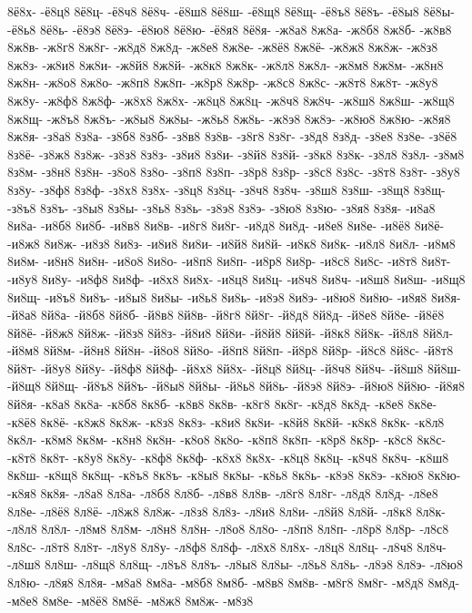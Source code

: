 {8ё8х-
-ё8ц8
8ё8ц-
-ё8ч8
8ё8ч-
-ё8ш8
8ё8ш-
-ё8щ8
8ё8щ-
-ё8ъ8
8ё8ъ-
-ё8ы8
8ё8ы-
-ё8ь8
8ё8ь-
-ё8э8
8ё8э-
-ё8ю8
8ё8ю-
-ё8я8
8ё8я-
-ж8а8
8ж8а-
-ж8б8
8ж8б-
-ж8в8
8ж8в-
-ж8г8
8ж8г-
-ж8д8
8ж8д-
-ж8е8
8ж8е-
-ж8ё8
8ж8ё-
-ж8ж8
8ж8ж-
-ж8з8
8ж8з-
-ж8и8
8ж8и-
-ж8й8
8ж8й-
-ж8к8
8ж8к-
-ж8л8
8ж8л-
-ж8м8
8ж8м-
-ж8н8
8ж8н-
-ж8о8
8ж8о-
-ж8п8
8ж8п-
-ж8р8
8ж8р-
-ж8с8
8ж8с-
-ж8т8
8ж8т-
-ж8у8
8ж8у-
-ж8ф8
8ж8ф-
-ж8х8
8ж8х-
-ж8ц8
8ж8ц-
-ж8ч8
8ж8ч-
-ж8ш8
8ж8ш-
-ж8щ8
8ж8щ-
-ж8ъ8
8ж8ъ-
-ж8ы8
8ж8ы-
-ж8ь8
8ж8ь-
-ж8э8
8ж8э-
-ж8ю8
8ж8ю-
-ж8я8
8ж8я-
-з8а8
8з8а-
-з8б8
8з8б-
-з8в8
8з8в-
-з8г8
8з8г-
-з8д8
8з8д-
-з8е8
8з8е-
-з8ё8
8з8ё-
-з8ж8
8з8ж-
-з8з8
8з8з-
-з8и8
8з8и-
-з8й8
8з8й-
-з8к8
8з8к-
-з8л8
8з8л-
-з8м8
8з8м-
-з8н8
8з8н-
-з8о8
8з8о-
-з8п8
8з8п-
-з8р8
8з8р-
-з8с8
8з8с-
-з8т8
8з8т-
-з8у8
8з8у-
-з8ф8
8з8ф-
-з8х8
8з8х-
-з8ц8
8з8ц-
-з8ч8
8з8ч-
-з8ш8
8з8ш-
-з8щ8
8з8щ-
-з8ъ8
8з8ъ-
-з8ы8
8з8ы-
-з8ь8
8з8ь-
-з8э8
8з8э-
-з8ю8
8з8ю-
-з8я8
8з8я-
-и8а8
8и8а-
-и8б8
8и8б-
-и8в8
8и8в-
-и8г8
8и8г-
-и8д8
8и8д-
-и8е8
8и8е-
-и8ё8
8и8ё-
-и8ж8
8и8ж-
-и8з8
8и8з-
-и8и8
8и8и-
-и8й8
8и8й-
-и8к8
8и8к-
-и8л8
8и8л-
-и8м8
8и8м-
-и8н8
8и8н-
-и8о8
8и8о-
-и8п8
8и8п-
-и8р8
8и8р-
-и8с8
8и8с-
-и8т8
8и8т-
-и8у8
8и8у-
-и8ф8
8и8ф-
-и8х8
8и8х-
-и8ц8
8и8ц-
-и8ч8
8и8ч-
-и8ш8
8и8ш-
-и8щ8
8и8щ-
-и8ъ8
8и8ъ-
-и8ы8
8и8ы-
-и8ь8
8и8ь-
-и8э8
8и8э-
-и8ю8
8и8ю-
-и8я8
8и8я-
-й8а8
8й8а-
-й8б8
8й8б-
-й8в8
8й8в-
-й8г8
8й8г-
-й8д8
8й8д-
-й8е8
8й8е-
-й8ё8
8й8ё-
-й8ж8
8й8ж-
-й8з8
8й8з-
-й8и8
8й8и-
-й8й8
8й8й-
-й8к8
8й8к-
-й8л8
8й8л-
-й8м8
8й8м-
-й8н8
8й8н-
-й8о8
8й8о-
-й8п8
8й8п-
-й8р8
8й8р-
-й8с8
8й8с-
-й8т8
8й8т-
-й8у8
8й8у-
-й8ф8
8й8ф-
-й8х8
8й8х-
-й8ц8
8й8ц-
-й8ч8
8й8ч-
-й8ш8
8й8ш-
-й8щ8
8й8щ-
-й8ъ8
8й8ъ-
-й8ы8
8й8ы-
-й8ь8
8й8ь-
-й8э8
8й8э-
-й8ю8
8й8ю-
-й8я8
8й8я-
-к8а8
8к8а-
-к8б8
8к8б-
-к8в8
8к8в-
-к8г8
8к8г-
-к8д8
8к8д-
-к8е8
8к8е-
-к8ё8
8к8ё-
-к8ж8
8к8ж-
-к8з8
8к8з-
-к8и8
8к8и-
-к8й8
8к8й-
-к8к8
8к8к-
-к8л8
8к8л-
-к8м8
8к8м-
-к8н8
8к8н-
-к8о8
8к8о-
-к8п8
8к8п-
-к8р8
8к8р-
-к8с8
8к8с-
-к8т8
8к8т-
-к8у8
8к8у-
-к8ф8
8к8ф-
-к8х8
8к8х-
-к8ц8
8к8ц-
-к8ч8
8к8ч-
-к8ш8
8к8ш-
-к8щ8
8к8щ-
-к8ъ8
8к8ъ-
-к8ы8
8к8ы-
-к8ь8
8к8ь-
-к8э8
8к8э-
-к8ю8
8к8ю-
-к8я8
8к8я-
-л8а8
8л8а-
-л8б8
8л8б-
-л8в8
8л8в-
-л8г8
8л8г-
-л8д8
8л8д-
-л8е8
8л8е-
-л8ё8
8л8ё-
-л8ж8
8л8ж-
-л8з8
8л8з-
-л8и8
8л8и-
-л8й8
8л8й-
-л8к8
8л8к-
-л8л8
8л8л-
-л8м8
8л8м-
-л8н8
8л8н-
-л8о8
8л8о-
-л8п8
8л8п-
-л8р8
8л8р-
-л8с8
8л8с-
-л8т8
8л8т-
-л8у8
8л8у-
-л8ф8
8л8ф-
-л8х8
8л8х-
-л8ц8
8л8ц-
-л8ч8
8л8ч-
-л8ш8
8л8ш-
-л8щ8
8л8щ-
-л8ъ8
8л8ъ-
-л8ы8
8л8ы-
-л8ь8
8л8ь-
-л8э8
8л8э-
-л8ю8
8л8ю-
-л8я8
8л8я-
-м8а8
8м8а-
-м8б8
8м8б-
-м8в8
8м8в-
-м8г8
8м8г-
-м8д8
8м8д-
-м8е8
8м8е-
-м8ё8
8м8ё-
-м8ж8
8м8ж-
-м8з8
}
